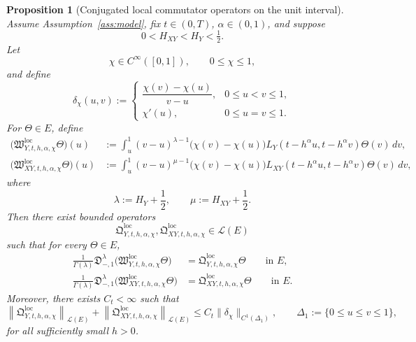 \documentclass[11pt,a4paper]{amsart}
\theoremstyle{plain}
\newtheorem{proposition}[theorem]{Proposition}
\theoremstyle{definition}
\theoremstyle{remark}
\begin{document}
\begin{proposition}[Conjugated local commutator operators on the unit interval]
\label{prop:local-smooth-commutator}
Assume Assumption~\ref{ass:model}, fix \(t\in(0,T)\), \(\alpha\in(0,1)\), and suppose
\[
0<H_{XY}<H_Y<\tfrac12.
\]
Let
\[
\chi\in C^\infty([0,1]),
\qquad
0\le \chi\le 1,
\]
and define
\[
\delta_\chi(u,v):=
\begin{cases}
\dfrac{\chi(v)-\chi(u)}{v-u}, & 0\le u<v\le 1,\\[1ex]
\chi'(u), & 0\le u=v\le 1.
\end{cases}
\]
For \(\Theta\in E\), define
\begin{align}
\bigl(
\mathfrak W_{Y,t,h,\alpha,\chi}^{\mathrm{loc}}
\Theta
\bigr)(u)
&:=
\int_u^1
(v-u)^{\lambda-1}
\bigl(\chi(v)-\chi(u)\bigr)
L_Y(t-h^\alpha u,t-h^\alpha v)\Theta(v)\,dv,
\label{eq:local-com-Y}\\
\bigl(
\mathfrak W_{XY,t,h,\alpha,\chi}^{\mathrm{loc}}
\Theta
\bigr)(u)
&:=
\int_u^1
(v-u)^{\mu-1}
\bigl(\chi(v)-\chi(u)\bigr)
L_{XY}(t-h^\alpha u,t-h^\alpha v)\Theta(v)\,dv,
\label{eq:local-com-XY}
\end{align}
where
\[
\lambda:=H_Y+\frac12,
\qquad
\mu:=H_{XY}+\frac12.
\]
Then there exist bounded operators
\[
\mathfrak Q_{Y,t,h,\alpha,\chi}^{\mathrm{loc}},
\mathfrak Q_{XY,t,h,\alpha,\chi}^{\mathrm{loc}}
\in\mathcal L(E)
\]
such that for every \(\Theta\in E\),
\begin{align}
\frac{1}{\Gamma(\lambda)}
\mathfrak D_{-,1}^{\lambda}
\bigl(
\mathfrak W_{Y,t,h,\alpha,\chi}^{\mathrm{loc}}\Theta
\bigr)
&=
\mathfrak Q_{Y,t,h,\alpha,\chi}^{\mathrm{loc}}\Theta
\qquad\text{in }E,
\label{eq:local-com-conj-Y}\\
\frac{1}{\Gamma(\lambda)}
\mathfrak D_{-,1}^{\lambda}
\bigl(
\mathfrak W_{XY,t,h,\alpha,\chi}^{\mathrm{loc}}\Theta
\bigr)
&=
\mathfrak Q_{XY,t,h,\alpha,\chi}^{\mathrm{loc}}\Theta
\qquad\text{in }E.
\label{eq:local-com-conj-XY}
\end{align}
Moreover, there exists \(C_t<\infty\) such that
\begin{equation}\label{eq:local-com-bound}
\left\|
\mathfrak Q_{Y,t,h,\alpha,\chi}^{\mathrm{loc}}
\right\|_{\mathcal L(E)}
+
\left\|
\mathfrak Q_{XY,t,h,\alpha,\chi}^{\mathrm{loc}}
\right\|_{\mathcal L(E)}
\le
C_t\|\delta_\chi\|_{C^1(\Delta_1)},
\qquad
\Delta_1:=\{0\le u\le v\le 1\},
\end{equation}
for all sufficiently small \(h>0\).
\end{proposition}
\end{document}
